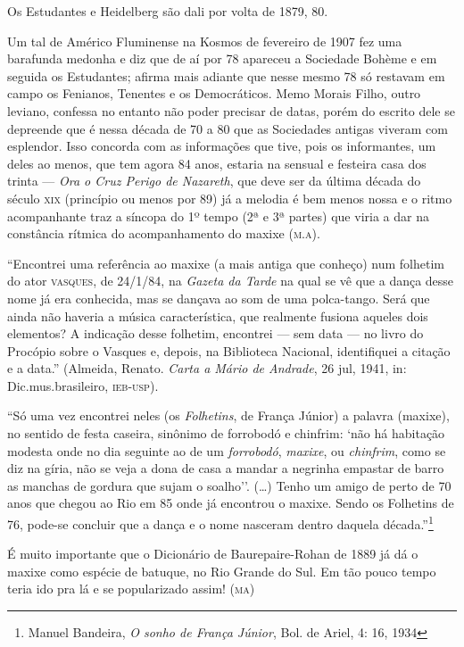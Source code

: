 Os Estudantes e Heidelberg são dali por volta de 1879, 80.

Um tal de Américo Fluminense na Kosmos de fevereiro de 1907 fez uma
barafunda medonha e diz que de aí por 78 apareceu a Sociedade Bohème e
em seguida os Estudantes; afirma mais adiante que nesse mesmo 78 só
restavam em campo os Fenianos, Tenentes e os Democráticos. Memo Morais
Filho, outro leviano, confessa no entanto não poder precisar de datas,
porém do escrito dele se depreende que é nessa década de 70 a 80 que as
Sociedades antigas viveram com esplendor. Isso concorda com as
informações que tive, pois os informantes, um deles ao menos, que tem
agora 84 anos, estaria na sensual e festeira casa dos trinta --- \emph{Ora
o Cruz Perigo de Nazareth}, que deve ser da última década do século \textsc{xix}
(princípio ou menos por 89) já a melodia é bem menos nossa e o ritmo
acompanhante traz a síncopa do 1º tempo (2ª e 3ª partes) que viria a
dar na constância rítmica do acompanhamento do maxixe (\textsc{m.a}).

``Encontrei uma referência ao maxixe (a mais antiga que conheço) num
folhetim do ator \textsc{vasques}, de 24/1/84, na \emph{Gazeta da Tarde} na qual
se vê que a dança desse nome já era conhecida, mas se dançava ao som de
uma polca-tango. Será que ainda não haveria a música característica, que
realmente fusiona aqueles dois elementos? A indicação desse folhetim,
encontrei --- sem data --- no livro do Procópio sobre o Vasques e, depois,
na Biblioteca Nacional, identifiquei a citação e a data.'' (Almeida,
Renato. \emph{Carta a Mário de Andrade}, 26 jul, 1941, in:
Dic.mus.brasileiro, \textsc{ieb-usp}).

``Só uma vez encontrei neles (os \emph{Folhetins}, de França Júnior) a
palavra (maxixe), no sentido de festa caseira, sinônimo de forrobodó e
chinfrim: `não há habitação modesta onde no dia seguinte ao de um
\emph{forrobodó}, \emph{maxixe}, ou \emph{chinfrim}, como se diz na
gíria, não se veja a dona de casa a mandar a negrinha empastar de barro
as manchas de gordura que sujam o soalho''. (\ldots{}) Tenho um amigo de perto
de 70 anos que chegou ao Rio em 85 onde já encontrou o maxixe. Sendo os
Folhetins de 76, pode-se concluir que a dança e o nome nasceram dentro
daquela década.''\footnote{Manuel Bandeira, \emph{O sonho de França Júnior}, Bol. de
Ariel, 4: 16, 1934}

É muito importante que o Dicionário de Baurepaire-Rohan de 1889 já dá o
maxixe como espécie de batuque, no Rio Grande do Sul. Em tão pouco tempo
teria ido pra lá e se popularizado assim! (\textsc{ma})

